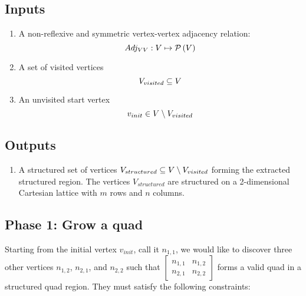 \newcommand{\Structured}{V_{structured}}

\newcommand{\AdjVV}{Adj_{\VertexSet\VertexSet}}

\newcommand{\vinit}{v_{init}}

\newcommand{\Quad}[4]{\begin{bmatrix} #1 & #2 \\ #3 & #4 \end{bmatrix}}

\newcommand{\Qinit}{\Quad{n_{1,1}} {n_{1,2}} {n_{2,1}} {n_{2,2}} }

\newcommand{\Qinitmirror}{ \Quad {n_{1,2}} {n_{1,1}} {n_{2,2}} {n_{2,1}} }



\subsection{Inputs}
\begin{enumerate}
\item A non-reflexive and symmetric vertex-vertex adjacency relation:
$$ \AdjVV: \VertexSet \mapsto \powerset{\VertexSet} $$

\item A set of visited vertices
$$ V_{visited} \subseteq V $$

\item An unvisited start vertex
$$ \vinit \in \VertexSet \setminus \Visited $$
\end{enumerate}


\subsection{Outputs}
\begin{enumerate}
\item A structured set of vertices $\Structured \subseteq \VertexSet \setminus \Visited $ forming the extracted structured region.
The vertices $\Structured$ are structured on a 2-dimensional Cartesian lattice with $m$ rows and $n$ columns.
\end{enumerate}



\subsection{Phase 1: Grow a quad}
\label{sec:grow_a_quad}
Starting from the initial vertex $\vinit$, call it $n_{1,1}$, we would like to discover three other vertices $n_{1,2}$, $n_{2,1}$, and $n_{2,2}$ such that $\Qinit$ forms a valid quad in a structured quad region. They must satisfy the following constraints:

